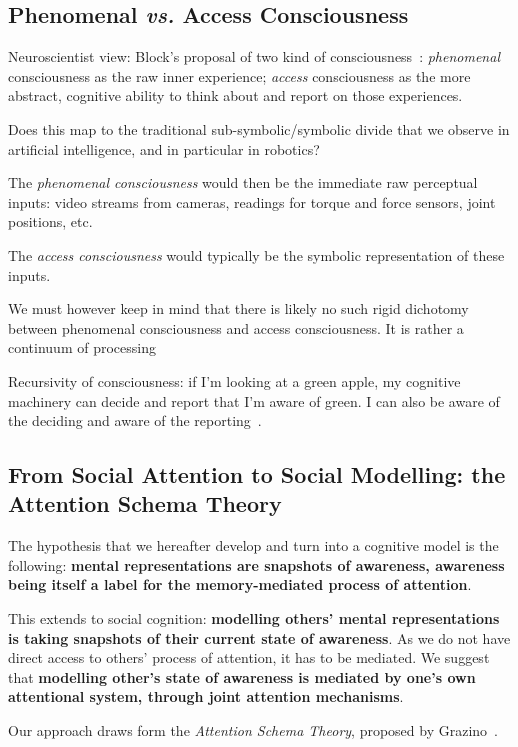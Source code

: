 \documentclass[a4paper]{article}
\newcommand{\vs}{\textit{vs.}\xspace}
\begin{document}
\subsection{Phenomenal \vs Access Consciousness}

Neuroscientist view: Block's proposal of two kind of consciousness~\cite{block1996can}:
\emph{phenomenal} consciousness as the raw inner experience; \emph{access}
consciousness as the more abstract, cognitive ability to think about and report
on those experiences.

Does this map to the traditional sub-symbolic/symbolic divide that we observe in
artificial intelligence, and in particular in robotics?

The \emph{phenomenal consciousness} would then be the immediate raw perceptual
inputs: video streams from cameras, readings for torque and force sensors, joint
positions, etc.

The \emph{access consciousness} would typically be the symbolic representation
of these inputs.


We must however keep in mind that there is likely no such rigid dichotomy
between phenomenal consciousness and access consciousness. It is rather a
continuum of processing~\citep[p.55]{graziano2013consciousness}

Recursivity of consciousness: if I'm looking at a green apple, my cognitive
machinery can decide and report that I'm aware of green. I can also be aware of
the deciding and aware of the reporting~\citep[p.55]{graziano2013consciousness}.

\subsection{From Social Attention to Social Modelling: the Attention Schema Theory}

The hypothesis that we hereafter develop and turn into a cognitive model is the
following: \textbf{mental representations are snapshots of awareness, awareness being
itself a label for the memory-mediated process of attention}.

This extends to social cognition: \textbf{modelling others' mental representations is
taking snapshots of their current state of awareness}. As we do not have direct
access to others' process of attention, it has to be mediated. We suggest that
\textbf{modelling other's state of awareness is mediated by one's own
attentional system, through joint attention mechanisms}.


Our approach draws form the \emph{Attention Schema Theory}, proposed by
Grazino~\cite{graziano2013consciousness}.
\end{document}
